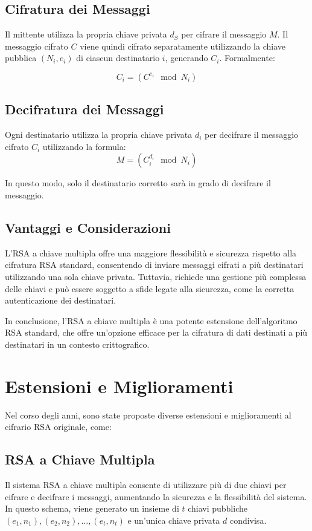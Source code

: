 \documentclass[a4paper,12pt]{report}
\begin{document}
\subsection{Cifratura dei Messaggi}

Il mittente utilizza la propria chiave privata \( d_S \) per cifrare il messaggio \( M \). Il messaggio cifrato \( C \) viene quindi cifrato separatamente utilizzando la chiave pubblica \( (N_i, e_i) \) di ciascun destinatario \( i \), generando \( C_i \). Formalmente:

\[C_i = (C^{e_i} \mod N_i)\]

\subsection{Decifratura dei Messaggi}

Ogni destinatario utilizza la propria chiave privata \( d_i \) per decifrare il messaggio cifrato \( C_i \) utilizzando la formula:
\[M = (C_i^{d_i} \mod N_i)\]

In questo modo, solo il destinatario corretto sarà in grado di decifrare il messaggio.

\subsection{Vantaggi e Considerazioni}

L'RSA a chiave multipla offre una maggiore flessibilità e sicurezza rispetto alla cifratura RSA standard, consentendo di inviare messaggi cifrati a più destinatari utilizzando una sola chiave privata. Tuttavia, richiede una gestione più complessa delle chiavi e può essere soggetto a sfide legate alla sicurezza, come la corretta autenticazione dei destinatari.

In conclusione, l'RSA a chiave multipla è una potente estensione dell'algoritmo RSA standard, che offre un'opzione efficace per la cifratura di dati destinati a più destinatari in un contesto crittografico.

\section{Estensioni e Miglioramenti}
Nel corso degli anni, sono state proposte diverse estensioni e miglioramenti al cifrario RSA originale, come:

\subsection{RSA a Chiave Multipla}
Il sistema RSA a chiave multipla consente di utilizzare più di due chiavi per cifrare e decifrare i messaggi, aumentando la sicurezza e la flessibilità del sistema. In questo schema, viene generato un insieme di $t$ chiavi pubbliche $(e_1, n_1), (e_2, n_2), \ldots, (e_t, n_t)$ e un'unica chiave privata $d$ condivisa.
\end{document}
